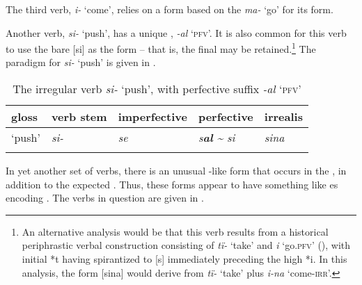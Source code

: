   The third verb, \textit{i-} ‘come’, relies on a  form based on the  \textit{ma-} ‘go’ for its  form.

  Another verb, \textit{si-} ‘push’, has a unique  , \textit{{}-al} ‘\textsc{pfv}’. It is also common for this verb to use the bare  [si] as the  form -- that is, the final  may be retained.\footnote{An alternative analysis would be that this verb results from a historical  periphrastic verbal construction consisting of \textit{tï-} ‘take’ and \textit{i} ‘go.\textsc{pfv}’ (), with initial *t having spirantized to [s] immediately preceding the  high  *i. In this analysis, the  form [sina] would derive from \textit{tï-} ‘take’ plus \textit{i-na} ‘come-\textsc{irr}’.} The paradigm for \textit{si-} ‘push’ is given in .


\begin{table}
\caption{The irregular verb \textit{si-} ‘push’, with perfective suffix \textit{-al} ‘\textsc{pfv}’}
\label{tab:4.4}
\begin{tabularx}{\textwidth}{QQQQQ}
\lsptoprule
gloss & verb stem & imperfective & perfective & irrealis\\
\midrule
‘push’ & {\itshape si-} & {\itshape se} & {\itshape s\textbf{al} \textup{{\textasciitilde}} si} & {\itshape sina}\\
\lspbottomrule
\end{tabularx}
\end{table}
  In yet another set of verbs, there is an unusual -like form that occurs in the  , in addition to the expected  . Thus, these forms appear to have something like es encoding  . The verbs in question are given in .


